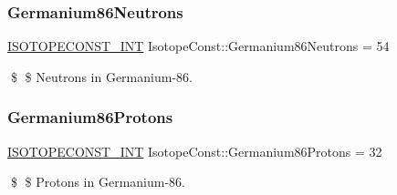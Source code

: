 \subsubsection{\texorpdfstring{Germanium86\+Neutrons}{Germanium86Neutrons}}
{\footnotesize\ttfamily \mbox{\hyperlink{group___isotope_const-_macros_ga5f18360b3e99483a35c32d789e62621c}{I\+S\+O\+T\+O\+P\+E\+C\+O\+N\+S\+T\+\_\+\+I\+NT}} Isotope\+Const\+::\+Germanium86\+Neutrons = 54}

\$ \$ Neutrons in Germanium-\/86. \mbox{\label{group___isotope_const-_germanium-_ge86_ga0ace2089b0f86239995d04471561ab7c}} 
\subsubsection{\texorpdfstring{Germanium86\+Protons}{Germanium86Protons}}
{\footnotesize\ttfamily \mbox{\hyperlink{group___isotope_const-_macros_ga5f18360b3e99483a35c32d789e62621c}{I\+S\+O\+T\+O\+P\+E\+C\+O\+N\+S\+T\+\_\+\+I\+NT}} Isotope\+Const\+::\+Germanium86\+Protons = 32}

\$ \$ Protons in Germanium-\/86. 